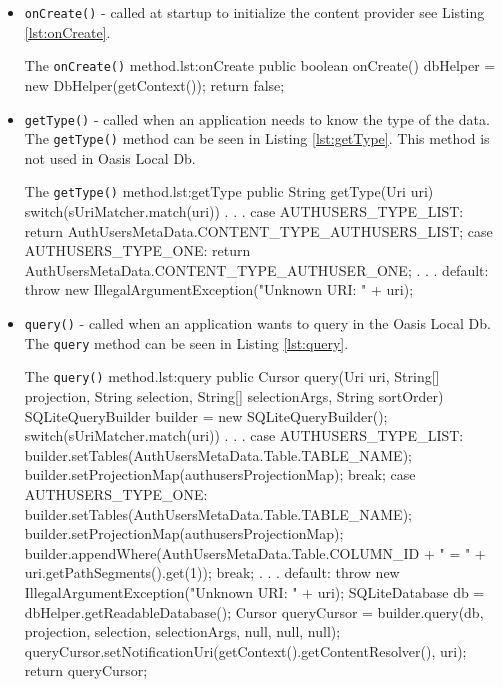 \begin{itemize}
	\item \texttt{onCreate()} - called at startup to initialize the content provider see Listing \vref{lst:onCreate}.
		
		\begin{Java}{The \texttt{onCreate()} method.}{lst:onCreate}
			public boolean onCreate() {
				dbHelper = new DbHelper(getContext());
				return false;
			}
		\end{Java}
	
	\item \texttt{getType()} - called when an application needs to know the type of the data. The \texttt{getType()} method can be seen in Listing \vref{lst:getType}. This method is not used in Oasis Local Db.
		
		\begin{Java}{The \texttt{getType()} method.}{lst:getType}
			public String getType(Uri uri) {
				switch(sUriMatcher.match(uri)) {
				.
				.
				.
				case AUTHUSERS_TYPE_LIST:
					return AuthUsersMetaData.CONTENT_TYPE_AUTHUSERS_LIST;
				case AUTHUSERS_TYPE_ONE:
					return AuthUsersMetaData.CONTENT_TYPE_AUTHUSER_ONE;
				.
				.
				.
				default:
					throw new IllegalArgumentException("Unknown URI: " + uri);
				}
			}
		\end{Java}
	
	\item \texttt{query()} - called when an application wants to query in the Oasis Local Db. The \texttt{query} method can be seen in Listing \vref{lst:query}.
		
		\begin{Java}{The \texttt{query()} method.}{lst:query}
			public Cursor query(Uri uri, String[] projection, String selection, String[] selectionArgs, String sortOrder) {
				SQLiteQueryBuilder builder = new SQLiteQueryBuilder();
				switch(sUriMatcher.match(uri)) {
				.
				.
				.
				case AUTHUSERS_TYPE_LIST:
					builder.setTables(AuthUsersMetaData.Table.TABLE_NAME);
					builder.setProjectionMap(authusersProjectionMap);
					break;
				case AUTHUSERS_TYPE_ONE:
					builder.setTables(AuthUsersMetaData.Table.TABLE_NAME);
					builder.setProjectionMap(authusersProjectionMap);
					builder.appendWhere(AuthUsersMetaData.Table.COLUMN_ID + " = " + uri.getPathSegments().get(1));
					break;
				.
				.
				.
				default:
					throw new IllegalArgumentException("Unknown URI: " + uri);
				}
				SQLiteDatabase db = dbHelper.getReadableDatabase();
				Cursor queryCursor = builder.query(db, projection, selection, selectionArgs, null, null, null);
				queryCursor.setNotificationUri(getContext().getContentResolver(), uri);
				return queryCursor;
			}
		\end{Java}
		

\end{itemize}
